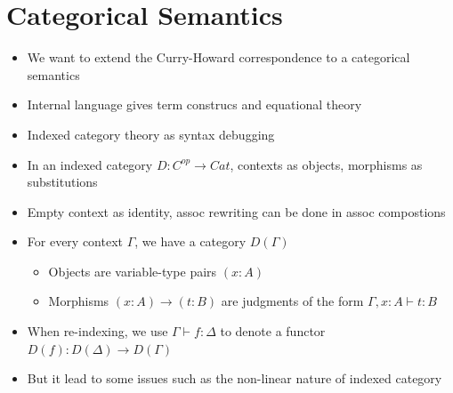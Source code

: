 \documentclass[11pt]{article}
\begin{document}
\section{Categorical Semantics}
\begin{itemize}
    \item We want to extend the Curry-Howard correspondence to a categorical semantics
    \item Internal language gives term construcs and equational theory
    \item Indexed category theory as syntax debugging
    \item In an indexed category $D : C^{op} \to Cat$, contexts as objects, morphisms as substitutions
    \item Empty context as identity, assoc rewriting can be done in assoc compostions
    \item For every context $\Gamma$, we have a category $D(\Gamma)$
        \begin{itemize}
            \item Objects are variable-type pairs $(x : A)$
            \item Morphisms $(x : A) \to (t : B)$ are judgments of the form $\Gamma, x : A \vdash t : B$
        \end{itemize}
    \item When re-indexing, we use $\Gamma \vdash f : \Delta$ to denote a functor $D(f) : D(\Delta) \to D(\Gamma)$
    \item But it lead to some issues such as the non-linear nature of indexed category
\end{itemize}
\end{document}

